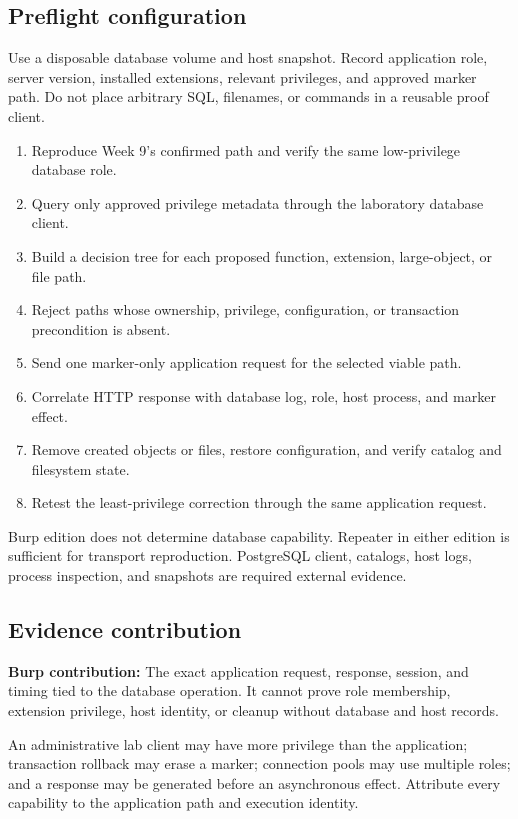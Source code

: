 \documentclass[11pt]{article}
\newcommand{\weekfield}[2]{%
  \Needspace{5\baselineskip}
  \subsection*{#1}
  #2
}
\newcommand{\burpevidence}[1]{\textbf{Burp contribution:} #1}
\begin{document}
\weekfield{Preflight configuration}{Use a disposable database volume and host
snapshot. Record application role, server version, installed extensions, relevant
privileges, and approved marker path. Do not place arbitrary SQL, filenames, or
commands in a reusable proof client.}

\begin{procedurebox}
\begin{enumerate}
  \item Reproduce Week 9's confirmed path and verify the same low-privilege database role.
  \item Query only approved privilege metadata through the laboratory database client.
  \item Build a decision tree for each proposed function, extension, large-object, or file path.
  \item Reject paths whose ownership, privilege, configuration, or transaction precondition is absent.
  \item Send one marker-only application request for the selected viable path.
  \item Correlate HTTP response with database log, role, host process, and marker effect.
  \item Remove created objects or files, restore configuration, and verify catalog and filesystem state.
  \item Retest the least-privilege correction through the same application request.
\end{enumerate}
\end{procedurebox}

\begin{editionbox}
Burp edition does not determine database capability. Repeater in either edition
is sufficient for transport reproduction. PostgreSQL client, catalogs, host logs,
process inspection, and snapshots are required external evidence.
\end{editionbox}

\weekfield{Evidence contribution}{\burpevidence{The exact application request,
response, session, and timing tied to the database operation.} It cannot prove
role membership, extension privilege, host identity, or cleanup without database
and host records.}

\begin{troubleshootingbox}
An administrative lab client may have more privilege than the application;
transaction rollback may erase a marker; connection pools may use multiple roles;
and a response may be generated before an asynchronous effect. Attribute every
capability to the application path and execution identity.
\end{troubleshootingbox}
\end{document}
